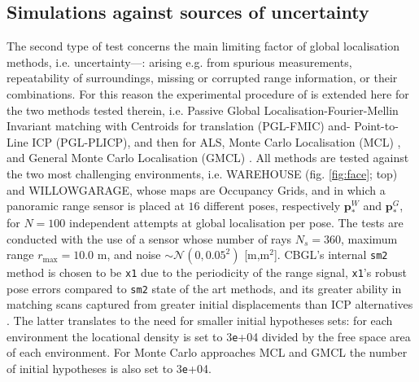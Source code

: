 \subsection{Simulations against sources of uncertainty}
\label{subsec:exp_b}

The second type of test concerns the main limiting factor of global
localisation methods, i.e. uncertainty---: arising e.g. from spurious
measurements, repeatability of surroundings, missing or corrupted range
information, or their combinations. For this reason the experimental procedure
of \cite{Filotheou2022g} is extended here for the two methods tested therein,
i.e. Passive Global Localisation-Fourier-Mellin Invariant matching with
Centroids for translation (PGL-FMIC) and- Point-to-Line ICP (PGL-PLICP), and
then for ALS, Monte Carlo Localisation (MCL) \cite{mcl}, and General Monte
Carlo Localisation (GMCL) \cite{gmcl}. All methods are tested against the two
most challenging environments, i.e.  WAREHOUSE (fig. \ref{fig:face}; top) and
WILLOWGARAGE, whose maps are Occupancy Grids, and in which a panoramic range
sensor is placed at $16$ different poses, respectively $\bm{p}_{\ast}^{W}$ and
$\bm{p}_{\ast}^{G}$, for $N = 100$ independent attempts at global localisation
per pose. The tests are conducted with the use of a sensor whose number of rays
$N_s = 360$, maximum range $r_{\max} = 10.0$ m, and noise $\sim \mathcal{N}(0,
0.05^2)$ [m,m$^2$].  CBGL's internal \texttt{sm2} method is chosen to be
\texttt{x1} \cite{Filotheou2023a} due to the periodicity of the range signal,
\texttt{x1}'s robust pose errors compared to \texttt{sm2} state of the art
methods, and its greater ability in matching scans captured from greater
initial displacements than ICP alternatives \cite{Filotheou2023a}.  The latter
translates to the need for smaller initial hypotheses sets: for each
environment the locational density is set to $3$\texttt{e}+04 divided by the
free space area of each environment. For Monte Carlo approaches MCL and GMCL
the number of initial hypotheses is also set to $3$\texttt{e}+04.

